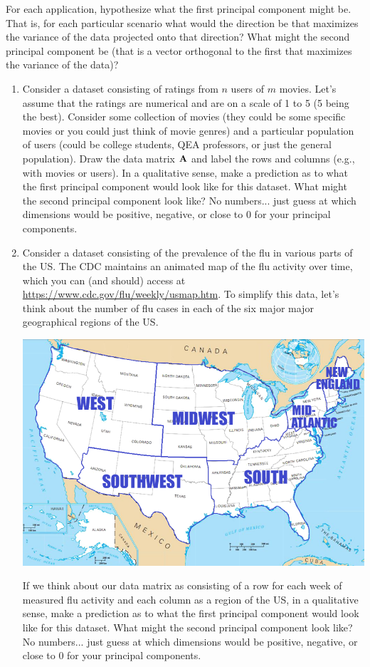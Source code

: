 \begin{prob}
For each application, hypothesize what the first principal component might be.  That is, for each particular scenario what would the direction be that maximizes the variance of the data projected onto that direction?  What might the second principal component be (that is a vector orthogonal to the first that maximizes the variance of the data)?

\begin{enumerate}
\item Consider a dataset consisting of ratings from $n$ users of $m$ movies.  Let's assume that the ratings are numerical and are on a scale of 1 to 5 (5 being the best).  Consider some collection of movies (they could be some specific movies or you could just think of movie genres) and a particular population of users (could be college students, QEA professors, or just the general population).  Draw the data matrix $\mathbf{A}$ and label the rows and columns (e.g., with movies or users).  In a qualitative sense, make a prediction as to what the first principal component would look like for this dataset.  What might the second principal component look like?  No numbers... just guess at which dimensions would be positive, negative, or close to 0 for your principal components.

\item Consider a dataset consisting of the prevalence of the flu in various parts of the US.  The CDC maintains an animated map of the flu activity over time, which you can (and should) access at \url{https://www.cdc.gov/flu/weekly/usmap.htm}.  To simplify this data, let's think about the number of flu cases in each of the six major major geographical regions of the US.

\begin{center}
\includegraphics[width=0.6\linewidth]{FacesDay7/figs/USRegionMap.png}
\end{center}

If we think about our data matrix as consisting of a row for each week of measured flu activity and each column as a region of the US, in a qualitative sense, make a prediction as to what the first principal component would look like for this dataset.  What might the second principal component look like?  No numbers... just guess at which dimensions would be positive, negative, or close to 0 for your principal components.

\end{enumerate}
\end{prob}


